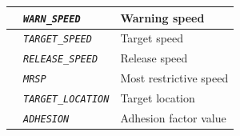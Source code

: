 \documentclass{template/openetcs}
\begin{document}
\begin{itemize}
\begin{longtable}{|l|l|l|}
			\hline
			
			&	\begin{minipage}[t]{0.40\linewidth} \emph{\texttt{WARN\_SPEED}} \end{minipage}
			&	\begin{minipage}[t]{0.38\linewidth} Warning speed \end{minipage} \\
			
			\hline
			
			&	\begin{minipage}[t]{0.40\linewidth} \emph{\texttt{TARGET\_SPEED}} \end{minipage}
			&	\begin{minipage}[t]{0.38\linewidth} Target speed \end{minipage} \\
			
			\hline
			
			&	\begin{minipage}[t]{0.40\linewidth} \emph{\texttt{RELEASE\_SPEED}} \end{minipage}
			&	\begin{minipage}[t]{0.38\linewidth} Release speed \end{minipage} \\ 
			
			\hline					
			
			&	\begin{minipage}[t]{0.40\linewidth} \emph{\texttt{MRSP}} \end{minipage}
			&	\begin{minipage}[t]{0.38\linewidth} Most restrictive speed \end{minipage} \\
			
			\hline
			
			&	\begin{minipage}[t]{0.40\linewidth} \emph{\texttt{TARGET\_LOCATION}} \end{minipage}
			&	\begin{minipage}[t]{0.38\linewidth} Target location \end{minipage} \\
			
			\hline
			
			&	\begin{minipage}[t]{0.40\linewidth} \emph{\texttt{ADHESION}} \end{minipage}
			&	\begin{minipage}[t]{0.38\linewidth} Adhesion factor value \end{minipage} \\
			

\end{longtable}
\end{itemize}
\end{document}
